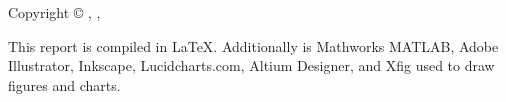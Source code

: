 \thispagestyle{empty}
{\small
\strut\vfill %
\noindent Copyright \copyright{} \projectGroup{}, \projectFaculty{} \projectSemester{}, \AAU{} \the\year\par
\vspace{0.2cm}
\noindent This report is compiled in \LaTeX. Additionally is Mathworks MATLAB, Adobe Illustrator, Inkscape, Lucidcharts.com, Altium Designer, and Xfig used to draw figures and charts.
}
\clearpage
